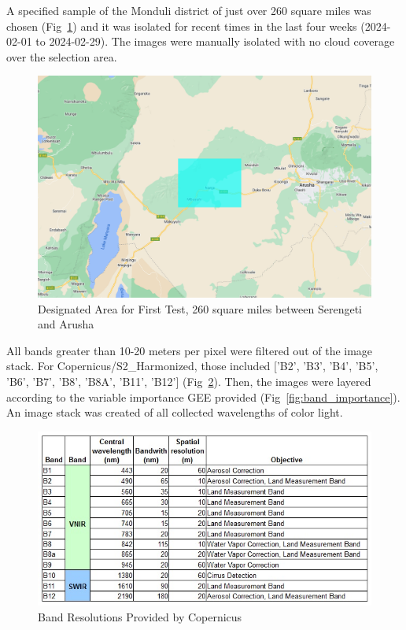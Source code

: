 \documentclass[10pt]{article}
\begin{document}
A specified sample of the Monduli district of just over 260 square miles was chosen (Fig~\ref{fig:designated_area}) and 
 it was isolated for recent times in the last four weeks (2024-02-01 to 2024-02-29). The images were manually isolated with no cloud coverage over the selection area.

\begin{figure} [H]
    \centering
    \includegraphics[width=1\linewidth]{images/studyarea.png}
    \caption{Designated Area for First Test, 260 square miles between Serengeti and Arusha}
    \label{fig:designated_area}
\end{figure}

All bands greater than 10-20 meters per pixel were filtered out of the image stack. For Copernicus/S2\_Harmonized, those included ['B2', 'B3', 'B4', 'B5', 'B6', 'B7', 'B8', 'B8A', 'B11', 'B12'] (Fig~\ref{fig:cop_bands_chart}). Then, the images were layered according to the variable importance GEE provided (Fig~\ref{fig:band_importance}). An image stack was created of all collected wavelengths of color light.

\begin{figure} [H]
    \centering
    \includegraphics[width=1\linewidth]{images/copernicus_band_resolution.png}
    \caption{Band Resolutions Provided by Copernicus}
    \label{fig:cop_bands_chart}
\end{figure}
\end{document}
